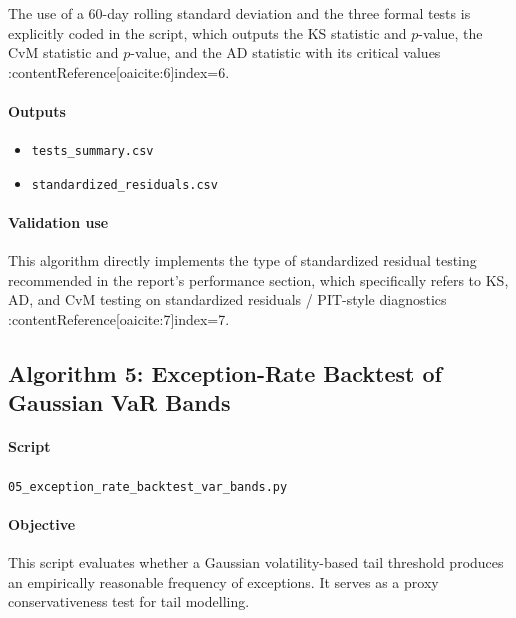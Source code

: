 	The use of a 60-day rolling standard deviation and the three formal tests is explicitly coded in the script, which outputs the KS statistic and \(p\)-value, the CvM statistic and \(p\)-value, and the AD statistic with its critical values :contentReference[oaicite:6]{index=6}.
	
	\paragraph{Outputs}
	\begin{itemize}
		\item \texttt{tests\_summary.csv}
		\item \texttt{standardized\_residuals.csv}
	\end{itemize}
	
	\paragraph{Validation use}
	This algorithm directly implements the type of standardized residual testing recommended in the report’s performance section, which specifically refers to KS, AD, and CvM testing on standardized residuals / PIT-style diagnostics :contentReference[oaicite:7]{index=7}.
	
	\subsection{Algorithm 5: Exception-Rate Backtest of Gaussian VaR Bands}
	
	\paragraph{Script}
	\texttt{05\_exception\_rate\_backtest\_var\_bands.py}
	
	\paragraph{Objective}
	This script evaluates whether a Gaussian volatility-based tail threshold produces an empirically reasonable frequency of exceptions. It serves as a proxy conservativeness test for tail modelling.
	
